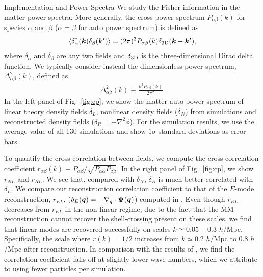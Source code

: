\begin{section}{Implementation and Power Spectra}
 We study the Fisher information in the matter power
 spectra. More generally,
 the cross power spectrum $P_{\alpha\beta}(k)$ for species $\alpha$ and $\beta$
 ($\alpha=\beta$ for auto power spectrum) is defined as
 \begin{align}
   \langle \delta_\alpha^\dagger(\bm{k})\delta_\beta(\bm{k'}) \rangle =
   (2\pi)^3 P_{\alpha\beta}(k) \delta_{\rm {3D}}(\bm{k}-\bm{k'}),
 \end{align}
 where $\delta_{\alpha}$ and $\delta_{\beta}$ are any two fields and
 $\delta_{\rm{3D}}$ is the three-dimensional Dirac delta function. We typically consider instead
 the dimensionless power spectrum, $\Delta_{\alpha\beta}^2(k)$, defined as
 \begin{align}
   \Delta_{\alpha\beta}^2(k) \equiv \frac{k^3 P_{\alpha\beta}(k)}{2\pi ^2}.
 \end{align}
 In the left panel of Fig.~\ref{fig:cp}, we show the matter auto power
 spectrum of linear theory density fields $\delta_L$, nonlinear density
 fields ($\delta_N$) from simulations and reconstructed density fields
 ($\delta_R=-\nabla^2\phi$).  For the simulation
 results, we use the average value of all 130 simulations and show
 $1\sigma$ standard deviations as error bars.  

 To quantify the cross-correlation
 between fields, we compute the cross correlation coefficient
 $r_{\alpha\beta}(k)\equiv P_{\alpha\beta}/\sqrt{P_{\alpha\alpha}P_{\beta\beta}}$.  In the right panel of
 Fig.~\ref{fig:cp}, we show $r_{NL}$ and $r_{RL}$.  We see that, compared with $\delta_N$,
 $\delta_R$ is much better correlated with $\delta_L$. 
 We compare our reconstruction correlation coefficient to that of the $E$-mode 
 reconstruction, $r_{EL}$, ($\delta_E(\boldsymbol{q})= - \nabla_q \cdot \boldsymbol{\Psi}(\boldsymbol{q})$) computed in \citet{bib:Yu2016}.
 Even though $r_{RL}$ decreases from $r_{EL}$ in the non-linear regime, due to the fact that the MM reconstruction 
 cannot recover the shell-crossing present on these scales, we find that linear
 modes are recovered successfully on scales $k\simeq 0.05 - 0.3$ $h$/Mpc.
 Specifically, the scale where $r(k)=1/2$ increases from $k\simeq 0.2$ $h$/Mpc to
 $0.8$ $h$/Mpc after reconstruction.  In comparison with the results of \citet{bib:ZhuH2016},
 we find the correlation coefficient falls off at slightly lower
 wave numbers, which we attribute to using fewer particles per simulation.


\end{section}

